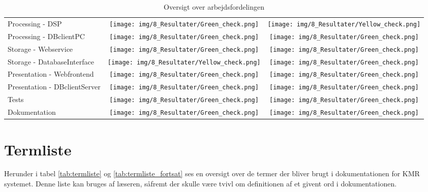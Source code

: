 \begin{appendices}
\begin{table}[H]
\begin{tabu}{  p{5.5cm} c  c }
		Processing - DSP & 
		\texttt{[image: img/8\_Resultater/Green\_check.png]} & \texttt{[image: img/8\_Resultater/Yellow\_check.png]} \\
		
		Processing - DBclientPC & \texttt{[image: img/8\_Resultater/Green\_check.png]} & \texttt{[image: img/8\_Resultater/Green\_check.png]} \\
		
		Storage - Webservice & \texttt{[image: img/8\_Resultater/Green\_check.png]} & \texttt{[image: img/8\_Resultater/Green\_check.png]} \\
		
		Storage - DatabaseInterface & \texttt{[image: img/8\_Resultater/Yellow\_check.png]} & \texttt{[image: img/8\_Resultater/Green\_check.png]} \\
		
		Presentation - Webfrontend & \texttt{[image: img/8\_Resultater/Green\_check.png]} & \texttt{[image: img/8\_Resultater/Green\_check.png]} \\
		
		Presentation - DBclientServer & \texttt{[image: img/8\_Resultater/Green\_check.png]} & \texttt{[image: img/8\_Resultater/Green\_check.png]} \\
		
		Tests & 
		\texttt{[image: img/8\_Resultater/Green\_check.png]} & \texttt{[image: img/8\_Resultater/Green\_check.png]} \\
		
		Dokumentation & 
		\texttt{[image: img/8\_Resultater/Green\_check.png]} & \texttt{[image: img/8\_Resultater/Green\_check.png]} \\
		
	\end{tabu}
	\caption{Oversigt over arbejdsfordelingen}
	\label{tab:arbejdsfordeling}
\end{table}


\chapter{Termliste} \label{appendix::termliste}

Herunder i tabel \ref{tab:termliste} og \ref{tab:termliste_fortsat} ses en oversigt over de termer der bliver brugt i dokumentationen for KMR systemet. Denne liste kan bruges af læseren, såfremt der skulle være tvivl om definitionen af et givent ord i dokumentationen.


\end{appendices}
